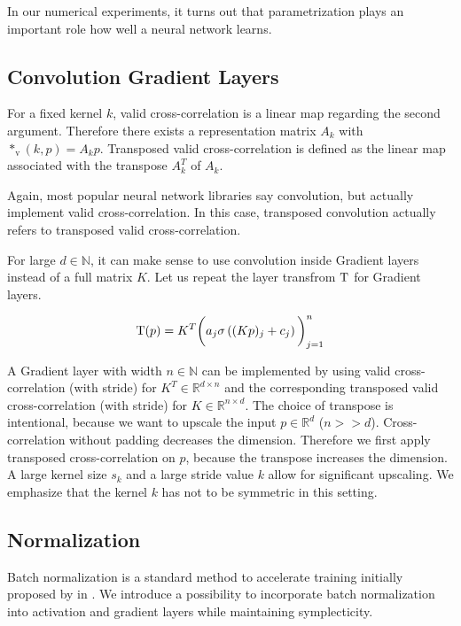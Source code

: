 \documentclass[twoside,a4paper]{article}
\begin{document}
In our numerical experiments, it turns out that
parametrization plays an important role how well a neural network learns.

\subsection{Convolution Gradient Layers}

For a fixed kernel $k$, valid cross-correlation is a linear map regarding the second argument. 
Therefore there exists a representation matrix $A_{k}$ with 
$*_{\text{v}}(k,p) = A_{k}p$. Transposed valid cross-correlation 
is defined as the linear map associated with the transpose $A_{k}^T$ of $A_{k}$.

Again, most popular neural network libraries say convolution, but actually implement
valid cross-correlation. In this case, transposed convolution actually refers to
transposed valid cross-correlation.

For large $d \in \mathbb{N}$, it can make sense to use convolution inside Gradient layers 
instead of a full matrix $K$. Let us repeat the layer transfrom $\mathrm{T}$ for Gradient layers.

\begin{equation*}
	\mathrm{T}(p) = K^T \bigg( a_j \sigma \left( (Kp)_j + c_j \right) \bigg)_{j=1}^n
\end{equation*}

A Gradient layer with width $n \in \mathbb{N}$ can be implemented by 
using valid cross-correlation (with stride) for $K^T \in \mathbb{R}^{d \times n}$ and the
corresponding transposed valid cross-correlation (with stride) for $K \in \mathbb{R}^{n \times d}$.
The choice of transpose is intentional, because we want to upscale the input $p \in \mathbb{R}^d$ ($n >> d$). 
Cross-correlation without padding decreases the dimension. Therefore we first apply 
transposed cross-correlation on $p$, because the transpose increases the dimension.
A large kernel size $s_k$ and a large stride value $k$ allow for significant upscaling.
We emphasize that the kernel $k$ has not to be symmetric in this setting.

\subsection{Normalization}

Batch normalization is a standard method to accelerate training initially proposed by
\citeauthor{batchnorm-ioffe15} in \cite{batchnorm-ioffe15}. 
We introduce a possibility to incorporate batch normalization
into activation and gradient layers while maintaining symplecticity.
\end{document}
